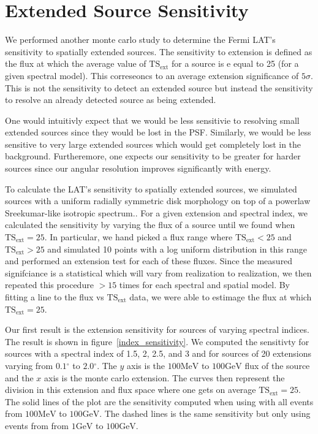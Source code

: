 \documentclass[preprint]{aastex}
\newcommand{\mev}{\text{MeV}\xspace}
\newcommand{\gev}{\text{GeV}\xspace}
\newcommand{\tsext}{\ensuremath{\text{TS}_\text{ext}}\xspace}
\renewcommand{\deg}{\ensuremath{^\circ}\xspace}
\begin{document}
\section{Extended Source Sensitivity}

We performed another monte carlo study to determine the Fermi LAT's
sensitivity to spatially extended sources. The sensitivity to extension
is defined as the flux at which 
the average value of $\tsext$ for a source is 
e equal to 25 (for a given spectral model). This correseoncs
to an average extension significance of $5\sigma$.  This is not the
sensitivity to detect an extended source but instead the sensitivity to
resolve an already detected source as being extended.  

One would intuitivly expect that we would be less sensitivie to resolving
small extended sources since they would be lost in the PSF.  Similarly,
we would be less sensitive to very large extended sources which would
get completely lost in the background. Furtheremore, one expects our
sensitivity to be greater for harder sources since our angular resolution
improves significantly with energy.

To calculate the LAT's sensitivity to spatially extended sources,
we simulated sources with a uniform radially symmetric
disk morphology on top of a powerlaw
Sreekumar-like isotropic spectrum.\cite{Sreekumar et al. ApJ 494 pag
523 1998}.  For a given extension and spectral index, we calculated the
sensitivity by varying the flux of a source until we found 
when $\tsext=25$. In particular, we hand picked a flux range
where $\tsext<25$ and $\tsext>25$ and simulated 10 points with
a log uniform distribution in this range and performed an extension
test for each of these fluxes. Since the measured signifciance is
a statistical which will vary from realization to realization,
we then repeated this procedure $>15$ times for each spectral
and spatial model.
By fitting a line to the flux vs $\tsext$ data, we were able to
estimage the flux at which $\tsext=25$.

Our first result is the extension sensitivity for sources of varying
spectral indices. The result is shown in figure~\ref{index_sensitivity}.
We computed the sensitivty for sources with a spectral index of 1.5,
2, 2.5, and 3 and for sources of 20 extensions varying from $0.1\deg$
to $2.0\deg$. The $y$ axis is the $100\mev$ to $100\gev$ flux of the
source and the $x$ axis is the monte carlo extension. The curves then
represent the division in this extension and flux space where one gets
on average $\tsext=25$.
The solid lines of the plot are the sensitivity computed when using
with all events from $100\mev$ to $100\gev$. The dashed lines is the
same sensitivity but only using events from from $1\gev$ to $100\gev$.
\end{document}
